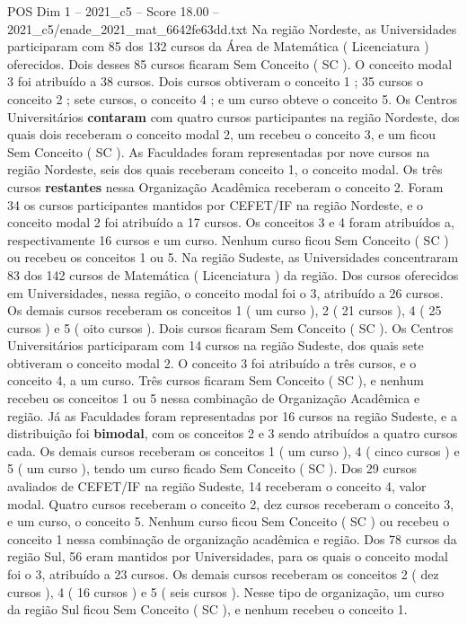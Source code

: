 \begin{textsample}{POS Dim 1 – 2021\_c5 – Score 18.00 – 2021\_c5/enade\_2021\_mat\_6642fe63dd.txt}
Na região Nordeste, as Universidades participaram com 85 dos 132 cursos da Área de Matemática ( Licenciatura ) oferecidos.
Dois desses 85 cursos ficaram Sem Conceito ( SC ).
O conceito modal 3 foi atribuído a 38 cursos.
Dois cursos obtiveram o conceito 1 ; 35 cursos o conceito 2 ; sete cursos, o conceito 4 ; e um curso obteve o conceito 5.
Os Centros Universitários \textbf{contaram} com quatro cursos participantes na região Nordeste, dos quais dois receberam o conceito modal 2, um recebeu o conceito 3, e um ficou Sem Conceito ( SC ).
As Faculdades foram representadas por nove cursos na região Nordeste, seis dos quais receberam conceito 1, o conceito modal.
Os três cursos \textbf{restantes} nessa Organização Acadêmica receberam o conceito 2.
Foram 34 os cursos participantes mantidos por CEFET/IF na região Nordeste, e o conceito modal 2 foi atribuído a 17 cursos.
Os conceitos 3 e 4 foram atribuídos a, respectivamente 16 cursos e um curso.
Nenhum curso ficou Sem Conceito ( SC ) ou recebeu os conceitos 1 ou 5.
Na região Sudeste, as Universidades concentraram 83 dos 142 cursos de Matemática ( Licenciatura ) da região.
Dos cursos oferecidos em Universidades, nessa região, o conceito modal foi o 3, atribuído a 26 cursos.
Os demais cursos receberam os conceitos 1 ( um curso ), 2 ( 21 cursos ), 4 ( 25 cursos ) e 5 ( oito cursos ).
Dois cursos ficaram Sem Conceito ( SC ).
Os Centros Universitários participaram com 14 cursos na região Sudeste, dos quais sete obtiveram o conceito modal 2.
O conceito 3 foi atribuído a três cursos, e o conceito 4, a um curso.
Três cursos ficaram Sem Conceito ( SC ), e nenhum recebeu os conceitos 1 ou 5 nessa combinação de Organização Acadêmica e região.
Já as Faculdades foram representadas por 16 cursos na região Sudeste, e a distribuição foi \textbf{bimodal}, com os conceitos 2 e 3 sendo atribuídos a quatro cursos cada.
Os demais cursos receberam os conceitos 1 ( um curso ), 4 ( cinco cursos ) e 5 ( um curso ), tendo um curso ficado Sem Conceito ( SC ).
Dos 29 cursos avaliados de CEFET/IF na região Sudeste, 14 receberam o conceito 4, valor modal.
Quatro cursos receberam o conceito 2, dez cursos receberam o conceito 3, e um curso, o conceito 5.
Nenhum curso ficou Sem Conceito ( SC ) ou recebeu o conceito 1 nessa combinação de organização acadêmica e região.
Dos 78 cursos da região Sul, 56 eram mantidos por Universidades, para os quais o conceito modal foi o 3, atribuído a 23 cursos.
Os demais cursos receberam os conceitos 2 ( dez cursos ), 4 ( 16 cursos ) e 5 ( seis cursos ).
Nesse tipo de organização, um curso da região Sul ficou Sem Conceito ( SC ), e nenhum recebeu o conceito 1.

\end{textsample}
